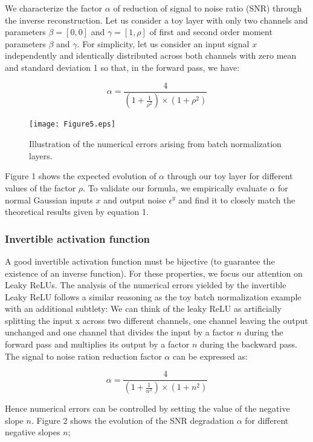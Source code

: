 \documentclass[10pt,twocolumn,letterpaper]{article}
\begin{document}
We characterize the factor $\alpha $ of reduction of signal to noise ratio (SNR) through the inverse reconstruction. 
Let us consider a toy layer with only two channels and parameters $\beta=[0,0]$ and $\gamma = [1, \rho]$ of first and second order moment parameters $\beta$ and $\gamma$. 
For simplicity, let us consider an input signal $x$ independently and identically distributed across both channels 
with zero mean and standard deviation 1 so that, in the forward pass, we have:

\begin{equation}
\alpha = \frac{4}{(1+\frac{1}{\rho^2}) \times (1 + \rho^2)}
\end{equation} 

\begin{figure}[h]
\begin{center}
\texttt{[image: Figure5.eps]}
\end{center}
   \caption{Illustration of the numerical errors arising from batch normalization layers.}
\end{figure}
Figure 1 shows the expected evolution of $\alpha$ through our toy layer for different values of the factor $\rho$.
To validate our formula, we empirically evaluate $\alpha$ for normal Gaussian inputs $x$ and output noise $\epsilon^y$ and find it to closely match the theoretical results given by equation 1.
\subsubsection{Invertible activation function}
  A good invertible activation function must be bijective (to guarantee the existence of an inverse function). For these properties, we focus our attention on Leaky ReLUs.
  The analysis of the numerical errors yielded by the invertible Leaky ReLU follows a similar reasoning as the toy batch normalization example with an additional subtlety: We can think of the leaky ReLU as artificially splitting the input x across two different channels, 
one channel leaving the output unchanged and one channel that divides the input by a factor $n$ during the forward pass and multiplies its output by a factor $n$ during the backward pass.
The signal to noise ration reduction factor $\alpha$ can be expressed as:

\begin{equation}
\alpha = \frac{4}{(1+\frac{1}{n^2}) \times (1 + n^2)}
\end{equation}

Hence numerical errors can be controlled by setting the value of the negative slope $n$.
Figure 2 shows the evolution of the SNR degradation $\alpha$ for different negative slopes $n$; 
\end{document}
